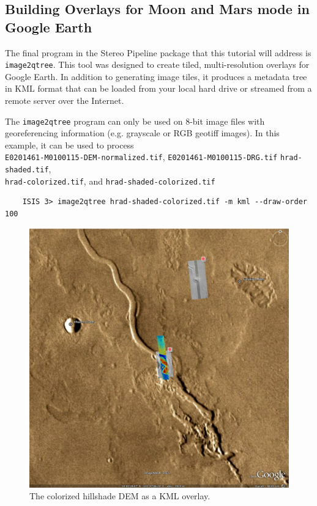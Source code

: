 \subsection{Building Overlays for Moon and Mars mode in Google Earth}

The final program in the Stereo Pipeline package that this tutorial
will address is \texttt{image2qtree}.  This tool was designed to
create tiled, multi-resolution overlays for Google Earth.  In addition
to generating image tiles, it produces a metadata tree in KML format
that can be loaded from your local hard drive or streamed from a
remote server over the Internet.  

The \texttt{image2qtree} program can only be used on 8-bit image files
with georeferencing information (e.g. grayscale or RGB geotiff
images). In this example, it can be used to process \\
\texttt{E0201461-M0100115-DEM-normalized.tif},
\texttt{E0201461-M0100115-DRG.tif} \texttt{hrad-shaded.tif}, \\
\texttt{hrad-colorized.tif}, and \texttt{hrad-shaded-colorized.tif}

\begin{verbatim}
    ISIS 3> image2qtree hrad-shaded-colorized.tif -m kml --draw-order 100
\end{verbatim}

\begin{figure}
\begin{center}
\includegraphics[width=6in]{images/p19-googlemars.png}
\caption[Hrad shaded colorized DEM as a KML overlay] {
    \label{hrad-kml}
        The colorized hillshade DEM as a KML overlay.  }
\end{center}
\end{figure}
